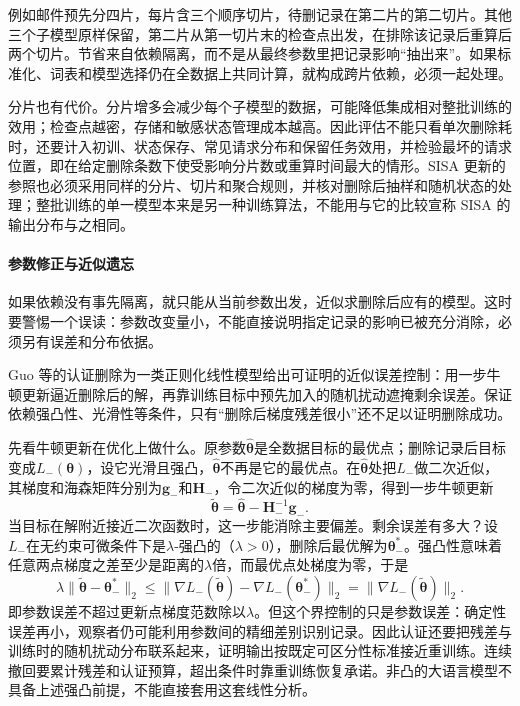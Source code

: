 例如邮件预先分四片，每片含三个顺序切片，待删记录在第二片的第二切片。其他三个子模型原样保留，第二片从第一切片末的检查点出发，在排除该记录后重算后两个切片。节省来自依赖隔离，而不是从最终参数里把记录影响“抽出来”。如果标准化、词表和模型选择仍在全数据上共同计算，就构成跨片依赖，必须一起处理。

分片也有代价。分片增多会减少每个子模型的数据，可能降低集成相对整批训练的效用；检查点越密，存储和敏感状态管理成本越高。因此评估不能只看单次删除耗时，还要计入初训、状态保存、常见请求分布和保留任务效用，并检验最坏的请求位置，即在给定删除条数下使受影响分片数或重算时间最大的情形。SISA 更新的参照也必须采用同样的分片、切片和聚合规则，并核对删除后抽样和随机状态的处理；整批训练的单一模型本来是另一种训练算法，不能用与它的比较宣称 SISA 的输出分布与之相同。

\paragraph{参数修正与近似遗忘}

如果依赖没有事先隔离，就只能从当前参数出发，近似求删除后应有的模型。这时要警惕一个误读：参数改变量小，不能直接说明指定记录的影响已被充分消除，必须另有误差和分布依据。

Guo 等的认证删除为一类正则化线性模型给出可证明的近似误差控制：用一步牛顿更新逼近删除后的解，再靠训练目标中预先加入的随机扰动遮掩剩余误差。保证依赖强凸性、光滑性等条件，只有“删除后梯度残差很小”还不足以证明删除成功。

先看牛顿更新在优化上做什么。原参数$\hat{\bm\theta}$是全数据目标的最优点；删除记录后目标变成$L_-(\bm\theta)$，设它光滑且强凸，$\hat{\bm\theta}$不再是它的最优点。在$\hat{\bm\theta}$处把$L_-$做二次近似，其梯度和海森矩阵分别为$\bm g_-$和$\bm H_-$，令二次近似的梯度为零，得到一步牛顿更新
\begin{equation}
 \tilde{\bm\theta}
 =\hat{\bm\theta}-\bm H_-^{-1}\bm g_-.
 \label{eq:privacy-newton-removal}
\end{equation}
当目标在解附近接近二次函数时，这一步能消除主要偏差。剩余误差有多大？设$L_-$在无约束可微条件下是$\lambda$-强凸的（$\lambda>0$），删除后最优解为$\bm\theta_-^*$。强凸性意味着任意两点梯度之差至少是距离的$\lambda$倍，而最优点处梯度为零，于是
\[
 \lambda\lVert\tilde{\bm\theta}-\bm\theta_-^*\rVert_2
 \leq\lVert\nabla L_-(\tilde{\bm\theta})-\nabla L_-(\bm\theta_-^*)\rVert_2
 =\lVert\nabla L_-(\tilde{\bm\theta})\rVert_2 .
\]
即参数误差不超过更新点梯度范数除以$\lambda$。但这个界控制的只是参数误差：确定性误差再小，观察者仍可能利用参数间的精细差别识别记录。因此认证还要把残差与训练时的随机扰动分布联系起来，证明输出按既定可区分性标准接近重训练。连续撤回要累计残差和认证预算，超出条件时靠重训练恢复承诺。非凸的大语言模型不具备上述强凸前提，不能直接套用这套线性分析。

